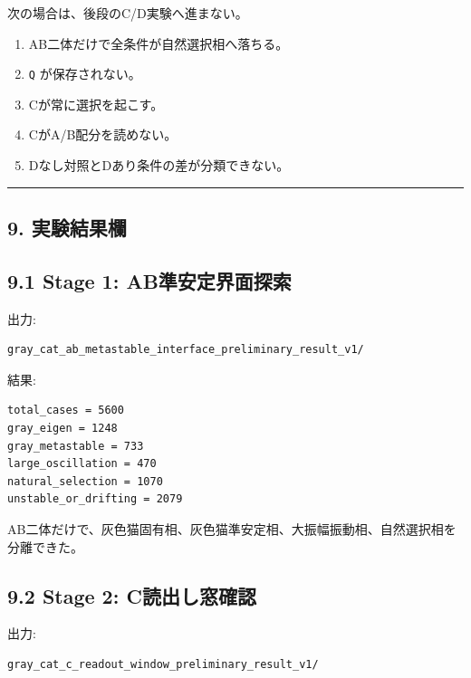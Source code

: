 \documentclass{article}
\providecommand{\tightlist}{\setlength{\itemsep}{0pt}\setlength{\parskip}{0pt}}
\begin{document}
次の場合は、後段のC/D実験へ進まない。

\begin{enumerate}
\def\labelenumi{\arabic{enumi}.}
\tightlist
\item
  AB二体だけで全条件が自然選択相へ落ちる。
\item
  \texttt{Q} が保存されない。
\item
  Cが常に選択を起こす。
\item
  CがA/B配分を読めない。
\item
  Dなし対照とDあり条件の差が分類できない。
\end{enumerate}

\begin{center}\rule{0.5\linewidth}{0.5pt}\end{center}

\subsection{9. 実験結果欄}\label{ux5b9fux9a13ux7d50ux679cux6b04}

\subsection{9.1 Stage 1:
AB準安定界面探索}\label{stage-1-abux6e96ux5b89ux5b9aux754cux9762ux63a2ux7d22-1}

出力:

\begin{verbatim}
gray_cat_ab_metastable_interface_preliminary_result_v1/
\end{verbatim}

結果:

\begin{verbatim}
total_cases = 5600
gray_eigen = 1248
gray_metastable = 733
large_oscillation = 470
natural_selection = 1070
unstable_or_drifting = 2079
\end{verbatim}

AB二体だけで、灰色猫固有相、灰色猫準安定相、大振幅振動相、自然選択相を分離できた。

\subsection{9.2 Stage 2:
C読出し窓確認}\label{stage-2-cux8aadux51faux3057ux7a93ux78baux8a8d}

出力:

\begin{verbatim}
gray_cat_c_readout_window_preliminary_result_v1/
\end{verbatim}
\end{document}

